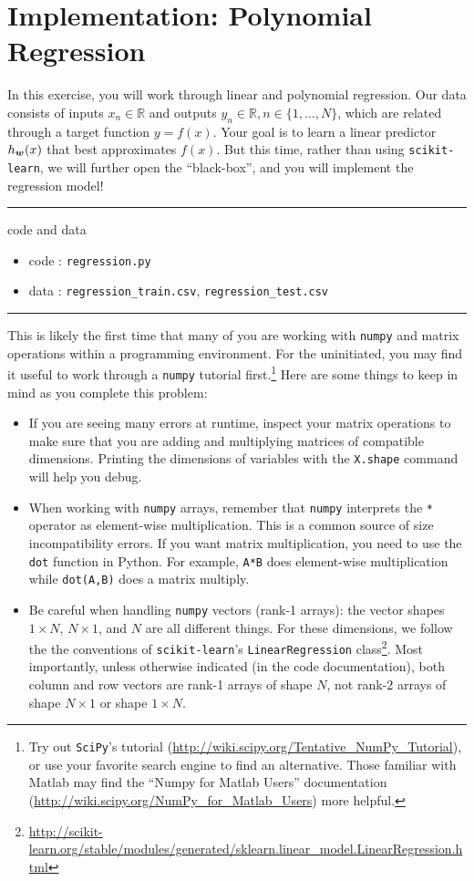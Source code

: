 \documentclass[11pt]{article}
\begin{document}
\newpage
\section{Implementation: Polynomial Regression }

In this exercise, you will work through linear and polynomial regression. Our data consists of inputs $x_n \in \mathbb{R}$ and outputs $y_n \in \mathbb{R}, n \in \{1,\ldots,N\}$, which are related through a target function $y = f(x)$. Your goal is to learn a linear predictor $h_{\boldsymbol{w}}(x)$ that best approximates $f(x)$. But this time, rather than using \verb|scikit-learn|, we will further open the ``black-box'', and you will implement the regression model!

\rule{\textwidth}{1pt}
code and data
\begin{itemize}[nolistsep]
\item code : \verb|regression.py|
\item data : \verb|regression_train.csv|, \verb|regression_test.csv|
\end{itemize}
\vspace{-\baselineskip}
\rule{\textwidth}{1pt}

This is likely the first time that many of you are working with \verb|numpy| and matrix operations within a programming environment. For the uninitiated, you may find it useful to work through a \verb|numpy| tutorial first.\footnote{Try out \verb~SciPy~'s tutorial (\url{http://wiki.scipy.org/Tentative_NumPy_Tutorial}), or use your favorite search engine to find an alternative. Those familiar with Matlab may find the ``Numpy for Matlab Users'' documentation (\url{http://wiki.scipy.org/NumPy_for_Matlab_Users}) more helpful.} Here are some things to keep in mind as you complete this problem:
\begin{itemize}[nosep]
\item If you are seeing many errors at runtime, inspect your matrix operations to make sure that you are adding and multiplying matrices of compatible dimensions. Printing the dimensions of variables with the \verb|X.shape| command will help you debug.
\item When working with \verb|numpy| arrays, remember that \verb|numpy| interprets the \verb|*| operator as element-wise multiplication. This is a common source of size incompatibility errors. If you want matrix multiplication, you need to use the \verb|dot| function in Python. For example, \verb|A*B| does element-wise multiplication while \verb|dot(A,B)| does a matrix multiply.
\item Be careful when handling \verb|numpy| vectors (rank-1 arrays): the vector shapes $1 \times N$, $N \times 1$, and $N$ are all different things. For these dimensions, we follow the the conventions of \verb|scikit-learn|'s \verb|LinearRegression| class\footnote{\url{http://scikit-learn.org/stable/modules/generated/sklearn.linear_model.LinearRegression.html}}. Most importantly, unless otherwise indicated (in the code documentation), both column and row vectors are rank-1 arrays of shape $N$, not rank-2 arrays of shape $N \times 1$ or shape $1 \times N$.
\end{itemize}
\end{document}
